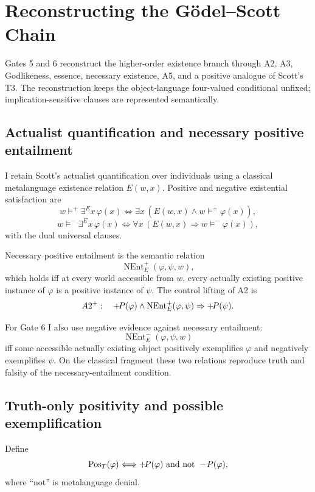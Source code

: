 \section{Reconstructing the G\"odel--Scott Chain}
\label{sec:reconstruction}

Gates 5 and 6 reconstruct the higher-order existence branch through A2, A3, Godlikeness, essence, necessary existence, A5, and a positive analogue of Scott's T3. The reconstruction keeps the object-language four-valued conditional unfixed; implication-sensitive clauses are represented semantically.

\subsection{Actualist quantification and necessary positive entailment}

I retain Scott's actualist quantification over individuals using a classical metalanguage existence relation \(E(w,x)\). Positive and negative existential satisfaction are
\[
  w\models^+\exists^E x\,\varphi(x)
  \Longleftrightarrow
  \exists x\,(E(w,x)\land w\models^+\varphi(x)),
\]
\[
  w\models^-\exists^E x\,\varphi(x)
  \Longleftrightarrow
  \forall x\,(E(w,x)\Rightarrow w\models^-\varphi(x)),
\]
with the dual universal clauses.

Necessary positive entailment is the semantic relation
\[
  \operatorname{NEnt}^{+}_{E}(\varphi,\psi,w),
\]
which holds iff at every world accessible from \(w\), every actually existing positive instance of \(\varphi\) is a positive instance of \(\psi\). The control lifting of A2 is
\[
  A2^+:\quad
  +\!P(\varphi)\land
  \operatorname{NEnt}^{+}_{E}(\varphi,\psi)
  \Rightarrow
  +\!P(\psi).
\]

For Gate 6 I also use negative evidence against necessary entailment:
\[
  \operatorname{NEnt}^{-}_{E}(\varphi,\psi,w)
\]
iff some accessible actually existing object positively exemplifies \(\varphi\) and negatively exemplifies \(\psi\). On the classical fragment these two relations reproduce truth and falsity of the necessary-entailment condition.

\subsection{Truth-only positivity and possible exemplification}

Define
\[
  \operatorname{Pos}_{T}(\varphi)
  \Longleftrightarrow
  +\!P(\varphi)
  \text{ and not }-\!P(\varphi),
\]
where ``not'' is metalanguage denial.

